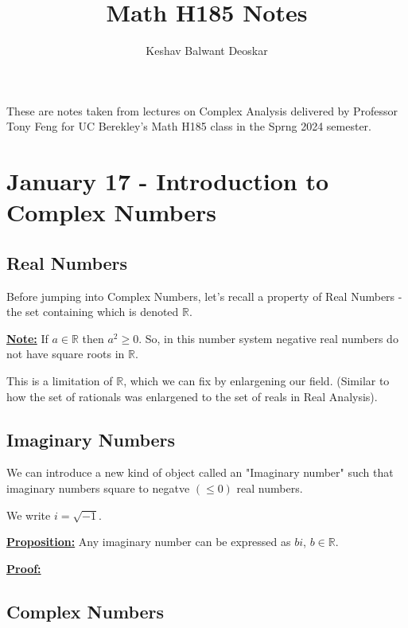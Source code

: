 \documentclass{article}
\title{Math H185 Notes}
\author{Keshav Balwant Deoskar}
\begin{document}
\maketitle

These are notes taken from lectures on Complex Analysis delivered by Professor Tony Feng for UC Berekley's Math H185 class in the Sprng 2024 semester.

\tableofcontents

\pagebreak

\section{January 17 - Introduction to Complex Numbers}

\vskip 0.5cm

\subsection{Real Numbers}
Before jumping into Complex Numbers, let's recall a property of Real Numbers - the set containing which is denoted $\mathbb{R}$.
\vskip 0.5cm

\underline{\textbf{Note:}} If $a \in \mathbb{R}$ then $a^2 \geq 0$.  
So, in this number system  negative real numbers do not have square roots in $\mathbb{R}$. 
\vskip 0.5cm

This is a limitation of $\mathbb{R}$, which we can fix by enlargening our field. (Similar to how the set of rationals was enlargened to the set of reals in Real Analysis).
\vskip 0.5cm


\subsection{Imaginary Numbers}
We can introduce a new kind of object called an "Imaginary number" such that imaginary numbers square to negatve $(\leq 0)$ real numbers.
\vskip 0.5cm

We write $i = \sqrt{-1}$.
\vskip 0.5cm

\underline{\textbf{Proposition:}} Any imaginary number can be expressed as $bi$, $b \in \mathbb{R}$.
\vskip 0.5cm

\underline{\textbf{Proof:}}

\subsection{Complex Numbers}
\end{document}
